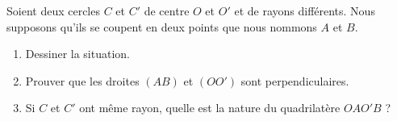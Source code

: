 
\begin{exercice}\label{exoSeconde-0100}

    Soient deux cercles \( C\) et \( C'\) de centre \( O\) et \( O'\) et de rayons différents. Nous supposons qu'ils se coupent en deux points que nous nommons \( A\) et \( B\).
    \begin{enumerate}
        \item
            Dessiner la situation.
        \item
            Prouver que les droites \( (AB)\) et \( (OO')\) sont perpendiculaires.
        \item
            Si \( C\) et \( C'\) ont même rayon, quelle est la nature du quadrilatère \( OAO'B\) ?
    \end{enumerate}

\end{exercice}
